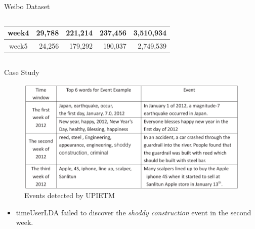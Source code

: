 \documentclass{beamer}
\begin{document}
\begin{frame}
\begin{columns}[T]
\begin{column}{.46\textwidth}
{\begin{block}{Weibo Dataset}
\begin{columns}
\begin{column}{.45\textwidth}
\begin{table}
{\begin{tabular}{|c|r|r|r|r|}
                                        week4 & 29,788 & 221,214& 237,456 & 3,510,934\\ \hline
                                        week5 & 24,256 & 179,292& 190,037 & 2,749,539\\ \hline
                                        \end{tabular}
                                }
                                \label{statisticsOfDataset}
                        \end{table}
                \end{column}
        \end{columns}

\end{block}

\begin{block}{Case Study}
\begin{figure}
\centering
        \includegraphics[width=.95\textwidth]{img/Event3.pdf}
        \caption{Events detected by UPIETM}
        \label{fig:event}
\end{figure}
\begin{itemize}
\item timeUserLDA\cite{timeUserLDA:2012} failed to discover the \emph{shoddy construction} event in the second week.
\end{itemize}
\end{block}

}
\end{column}
\end{columns}
\end{frame}
\end{document}

